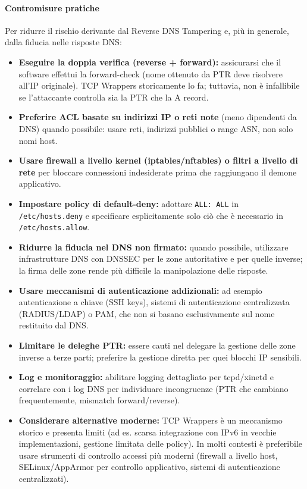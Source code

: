 \paragraph{Contromisure pratiche}
Per ridurre il rischio derivante dal Reverse DNS Tampering e, più in generale, dalla fiducia nelle risposte DNS:
\begin{itemize}
  \item \textbf{Eseguire la doppia verifica (reverse + forward):} assicurarsi che il software effettui la forward-check (nome ottenuto da PTR deve risolvere all'IP originale). TCP Wrappers storicamente lo fa; tuttavia, non è infallibile se l'attaccante controlla sia la PTR che la A record.
  \item \textbf{Preferire ACL basate su indirizzi IP o reti note} (meno dipendenti da DNS) quando possibile: usare reti, indirizzi pubblici o range ASN, non solo nomi host.
  \item \textbf{Usare firewall a livello kernel (iptables/nftables) o filtri a livello di rete} per bloccare connessioni indesiderate prima che raggiungano il demone applicativo.
  \item \textbf{Impostare policy di default-deny:} adottare \texttt{ALL: ALL} in \texttt{/etc/hosts.deny} e specificare esplicitamente solo ciò che è necessario in \texttt{/etc/hosts.allow}.
  \item \textbf{Ridurre la fiducia nel DNS non firmato:} quando possibile, utilizzare infrastrutture DNS con DNSSEC per le zone autoritative e per quelle inverse; la firma delle zone rende più difficile la manipolazione delle risposte.
  \item \textbf{Usare meccanismi di autenticazione addizionali:} ad esempio autenticazione a chiave (SSH keys), sistemi di autenticazione centralizzata (RADIUS/LDAP) o PAM, che non si basano esclusivamente sul nome restituito dal DNS.
  \item \textbf{Limitare le deleghe PTR:} essere cauti nel delegare la gestione delle zone inverse a terze parti; preferire la gestione diretta per quei blocchi IP sensibili.
  \item \textbf{Log e monitoraggio:} abilitare logging dettagliato per tcpd/xinetd e correlare con i log DNS per individuare incongruenze (PTR che cambiano frequentemente, mismatch forward/reverse).
  \item \textbf{Considerare alternative moderne:} TCP Wrappers è un meccanismo storico e presenta limiti (ad es. scarsa integrazione con IPv6 in vecchie implementazioni, gestione limitata delle policy). In molti contesti è preferibile usare strumenti di controllo accessi più moderni (firewall a livello host, SELinux/AppArmor per controllo applicativo, sistemi di autenticazione centralizzati).
\end{itemize}


